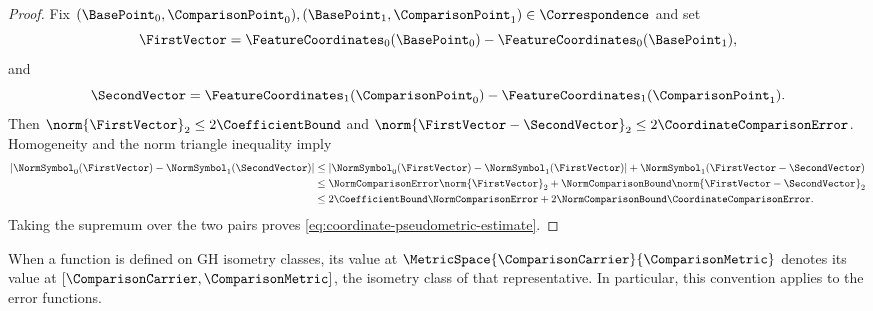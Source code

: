 \begin{proof}
Fix
$(\BasePoint_0,\ComparisonPoint_0),(\BasePoint_1,\ComparisonPoint_1)\in\Correspondence$
and set
\[
 \FirstVector=\FeatureCoordinates_0(\BasePoint_0)-\FeatureCoordinates_0(\BasePoint_1),
\]
and
\[
 \SecondVector=\FeatureCoordinates_1(\ComparisonPoint_0)-\FeatureCoordinates_1(\ComparisonPoint_1).
\]
Then
$\norm{\FirstVector}_2\leq2\CoefficientBound$
and
$\norm{\FirstVector-\SecondVector}_2\leq2\CoordinateComparisonError$.
Homogeneity and the norm triangle inequality imply
\[
 \begin{aligned}
 |\NormSymbol_0(\FirstVector)-\NormSymbol_1(\SecondVector)|
 &\leq|\NormSymbol_0(\FirstVector)-\NormSymbol_1(\FirstVector)|
       +\NormSymbol_1(\FirstVector-\SecondVector)\\
 &\leq\NormComparisonError\norm{\FirstVector}_2
       +\NormComparisonBound\norm{\FirstVector-\SecondVector}_2\\
 &\leq2\CoefficientBound\NormComparisonError
       +2\NormComparisonBound\CoordinateComparisonError.
 \end{aligned}
\]
Taking the supremum over the two pairs proves
\eqref{eq:coordinate-pseudometric-estimate}.
\end{proof}

When a function is defined on GH isometry classes, its value at
$\MetricSpace{\ComparisonCarrier}{\ComparisonMetric}$ denotes its value at
$[\ComparisonCarrier,\ComparisonMetric]$, the isometry class of that representative.
In particular, this convention applies to the error functions.

